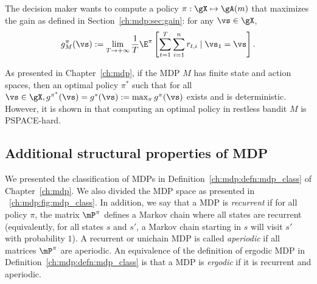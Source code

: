 The decision maker wants to compute a policy $\pi:\gX\mapsto\gA(m)$ that maximizes the gain as defined in Section~\ref{ch:mdp:sec:gain}: for any $\vs\in\gX$,
\begin{equation}
    \label{ch:restless:eq:obj}
    g^\pi_M(\vs):=\lim_{T\to+\infty}\frac1T \E^\pi\left[ \sum_{t=1}^{T} \sum_{i=1}^nr_{t,i} \mid \vs_1=\vs\right].
\end{equation}

As presented in Chapter~\ref{ch:mdp}, if the MDP $M$ has finite state and action spaces, then an optimal policy $\pi^*$ such that for all $\vs\in\gX, g^{\pi^*}(\vs)=g^*(\vs):=\max_{\pi}g^{\pi}(\vs)$ exists and is deterministic.
However, it is shown in \cite[Theorem~4]{papadimitriou1994complexity} that computing an optimal policy in restless bandit $M$ is PSPACE-hard.



\subsection{Additional structural properties of MDP}
\label{ssec:mdp_params}

We presented the classification of MDPs in Definition~\ref{ch:mdp:defn:mdp_class} of Chapter~\ref{ch:mdp}.
We also divided the MDP space as presented in \figurename~\ref{ch:mdp:fig:mdp_class}.
In addition, we say that a MDP is \emph{recurrent} if for all policy $\pi$, the matrix $\mP^\pi$ defines a Markov chain where all states are recurrent (equivalently, for all states $s$ and $s'$, a Markov chain starting in $s$ will visit $s'$ with probability $1$).
A recurrent or unichain MDP is called \emph{aperiodic} if all matrices $\mP^\pi$ are aperiodic.
An equivalence of the definition of ergodic MDP in Definition~\ref{ch:mdp:defn:mdp_class} is that a MDP is \emph{ergodic} if it is recurrent and aperiodic.

